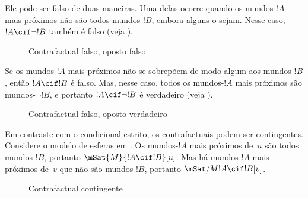 \documentclass[../../../include/open-logic-section]{subfiles}
\begin{document}
Ele pode ser falso de duas maneiras. Uma delas ocorre quando os mundos-$!A$
mais próximos não são todos mundos-$!B$, embora alguns o sejam. Nesse caso, $!A \cif
\lnot !B$ também é falso (veja ).
\begin{figure}
\begin{center}
\caption{Contrafactual falso, oposto falso}
\end{center}
\end{figure}
Se os mundos-$!A$ mais próximos não se sobrepõem de modo algum aos mundos-$!B$,
então $!A \cif !B$ é falso. Mas, nesse caso, todos os mundos-$!A$ mais próximos são
mundos-$\lnot !B$, e portanto $!A \cif \lnot !B$ é verdadeiro (veja
).
\begin{figure}
\begin{center}
\caption{Contrafactual falso, oposto verdadeiro}
\end{center}
\end{figure}

Em contraste com o condicional estrito, os contrafactuais podem ser
contingentes. Considere o modelo de esferas em . Os
mundos-$!A$ mais próximos de~$u$ são todos mundos-$!B$, portanto $\mSat{M}{!A \cif
  !B}[u]$. Mas há mundos-$!A$ mais próximos de~$v$ que não são
mundos-$!B$, portanto $\mSat/{M}{!A \cif !B}[v]$.
\begin{figure}
\begin{center}
\end{center}
\caption{Contrafactual contingente}
\end{figure}
\end{document}
